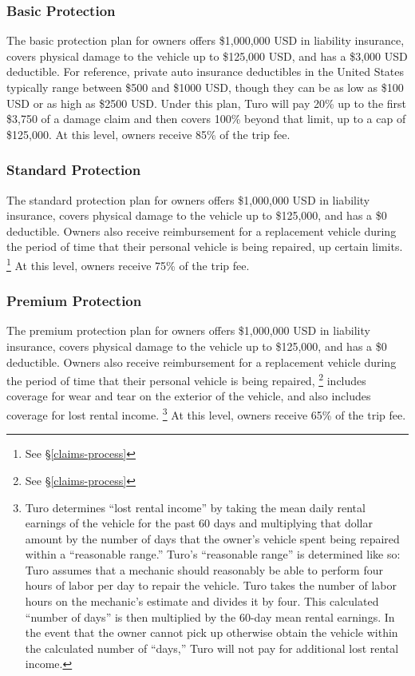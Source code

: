 \documentclass[review,12pt]{elsarticle}
\begin{document}
\subsubsection{Basic Protection}
The basic protection plan for owners offers \$1,000,000 USD in liability insurance, covers physical damage to the vehicle up to \$125,000 USD, and has a \$3,000 USD deductible. For reference, private auto insurance deductibles in the United States typically range between \$500 and \$1000 USD, though they can be as low as \$100 USD or as high as \$2500 USD. Under this plan, Turo will pay 20\% up to the first \$3,750 of a damage claim and then covers 100\% beyond that limit, up to a cap of \$125,000. At this level, owners receive 85\% of the trip fee.

\subsubsection{Standard Protection}
The standard protection plan for owners offers \$1,000,000 USD in liability insurance, covers physical damage to the vehicle up to \$125,000, and has a \$0 deductible. Owners also receive reimbursement for a replacement vehicle during the period of time that their personal vehicle is being repaired, up certain limits.
\footnote{See \S\ref{claims-process}
}
At this level, owners receive 75\% of the trip fee.

\subsubsection{Premium Protection}\label{owner-premium-protection}
The premium protection plan for owners offers \$1,000,000 USD in liability insurance, covers physical damage to the vehicle up to \$125,000, and has a \$0 deductible. Owners also receive reimbursement for a replacement vehicle during the period of time that their personal vehicle is being repaired,
\footnote{See \S\ref{claims-process}
}
includes coverage for wear and tear on the exterior of the vehicle, and also includes coverage for lost rental income.
\footnote{Turo determines ``lost rental income'' by taking the mean daily rental earnings of the vehicle for the past 60 days and multiplying that dollar amount by the number of days that the owner's vehicle spent being repaired within a ``reasonable range.'' Turo's ``reasonable range'' is determined like so: Turo assumes that a mechanic should reasonably be able to perform four hours of labor per day to repair the vehicle. Turo takes the number of labor hours on the mechanic's estimate and divides it by four. This calculated ``number of days'' is then multiplied by the 60-day mean rental earnings. In the event that the owner cannot pick up otherwise obtain the vehicle within the calculated number of ``days,'' Turo will not pay for additional lost rental income.
}
At this level, owners receive 65\% of the trip fee.
\end{document}
